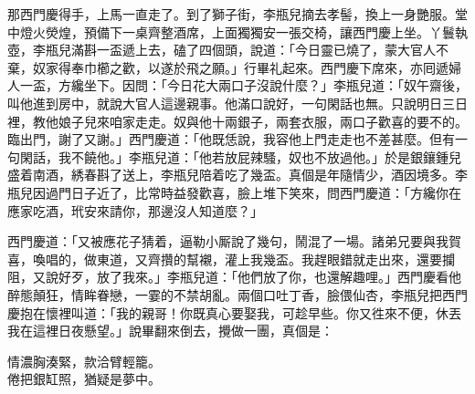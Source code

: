 那西門慶得手，上馬一直走了。到了獅子街，李瓶兒摘去孝髻，換上一身艷服。堂中燈火熒煌，預備下一桌齊整酒席，{}上面獨獨安一張交椅，讓西門慶上坐。丫鬟執壺，李瓶兒滿斟一盃遞上去，磕了四個頭，說道：「今日靈已燒了，蒙大官人不棄，奴家得奉巾櫛之歡，以遂於飛之願。」行畢礼起來。西門慶下席來，亦囘遞婦人一盃，方纔坐下。因問：「今日花大兩口子沒說什麼？」{}李瓶兒道：「奴午齋後，叫他進到房中，就說大官人這邊親事。他滿口說好，一句閑話也無。只說明日三日裡，教他娘子兒來咱家走走。奴與他十兩銀子，兩套衣服，兩口子歡喜的要不的。臨出門，謝了又謝。」西門慶道：「他既恁說，我容他上門走走也不差甚麼。但有一句閑話，我不饒他。」{}李瓶兒道：「他若放屁辣騷，奴也不放過他。」於是銀鑲鍾兒盛着南酒，綉春斟了送上，李瓶兒陪着吃了幾盃。真個是年隨情少，酒因境多。李瓶兒因過門日子近了，比常時益發歡喜，臉上堆下笑來，問西門慶道：「方纔你在應家吃酒，玳安來請你，那邊沒人知道麼？」

西門慶道：「又被應花子猜着，逼勒小厮說了幾句，鬧混了一場。諸弟兄要與我賀喜，喚唱的，做東道，又齊攢的幫襯，灌上我幾盃。我趕眼錯就走出來，還要攔阻，又說好歹，放了我來。」{}李瓶兒道：「他們放了你，也還解趣哩。」西門慶看他醉態顛狂，情眸眷戀，一霎的不禁胡亂。兩個口吐丁香，臉偎仙杏，李瓶兒把西門慶抱在懷裡叫道：「我的親哥！你既真心要娶我，可趁早些。{}你又徃來不便，休丟我在這裡日夜懸望。」說畢翻來倒去，攪做一團，真個是：

\begin{myquote}
情濃胸湊緊，款洽臂輕籠。\\倦把銀缸照，猶疑是夢中。
\end{myquote}

 

